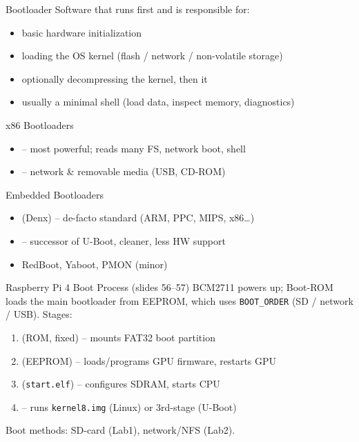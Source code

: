 \begin{concept}{Bootloader}
    Software that runs first and is responsible for:
    \begin{itemize}
        \item basic hardware initialization
        \item loading the OS kernel (flash / network / non-volatile storage)
        \item optionally decompressing the kernel, then  it
        \item usually a minimal shell (load data, inspect memory, diagnostics)
    \end{itemize}
\end{concept}


\begin{definition}{x86 Bootloaders}
    \begin{itemize}
        \item {} -- most powerful; reads many FS, network boot, shell
        \item {} -- network \& removable media (USB, CD-ROM)
    \end{itemize}
\end{definition}

\begin{definition}{Embedded Bootloaders}
    \begin{itemize}
        \item {} (Denx) -- de-facto standard (ARM, PPC, MIPS, x86\dots)
        \item {} -- successor of U-Boot, cleaner, less HW support
        \item RedBoot, Yaboot, PMON (minor)
    \end{itemize}
\end{definition}

\multend

\begin{corollary}{Raspberry Pi 4 Boot Process (slides 56--57)}
    BCM2711 powers up; Boot-ROM loads the main bootloader from EEPROM, which uses
    \texttt{BOOT\_ORDER} (SD / network / USB). Stages:
    \begin{enumerate}
        \item {} (ROM, fixed) -- mounts FAT32 boot partition
        \item {} (EEPROM) -- loads/programs GPU firmware, restarts GPU
        \item {} (\texttt{start.elf}) -- configures SDRAM, starts CPU
        \item {} -- runs \texttt{kernel8.img} (Linux) or 3rd-stage (U-Boot)
    \end{enumerate}
    Boot methods:  SD-card (Lab1),  network/NFS (Lab2).
\end{corollary}

